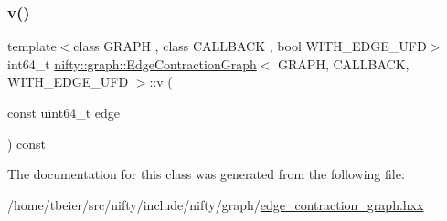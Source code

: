 \subsubsection{\texorpdfstring{v()}{v()}}
{\footnotesize\ttfamily template$<$class G\+R\+A\+PH , class C\+A\+L\+L\+B\+A\+CK , bool W\+I\+T\+H\+\_\+\+E\+D\+G\+E\+\_\+\+U\+FD$>$ \\
int64\+\_\+t \hyperlink{classnifty_1_1graph_1_1EdgeContractionGraph}{nifty\+::graph\+::\+Edge\+Contraction\+Graph}$<$ G\+R\+A\+PH, C\+A\+L\+L\+B\+A\+CK, W\+I\+T\+H\+\_\+\+E\+D\+G\+E\+\_\+\+U\+FD $>$\+::v (\begin{DoxyParamCaption}\item[{const uint64\+\_\+t}]{edge }\end{DoxyParamCaption}) const\hspace{0.3cm}{\ttfamily [inline]}}



The documentation for this class was generated from the following file\+:\begin{DoxyCompactItemize}
\item 
/home/tbeier/src/nifty/include/nifty/graph/\hyperlink{graph_2edge__contraction__graph_8hxx}{edge\+\_\+contraction\+\_\+graph.\+hxx}\end{DoxyCompactItemize}
